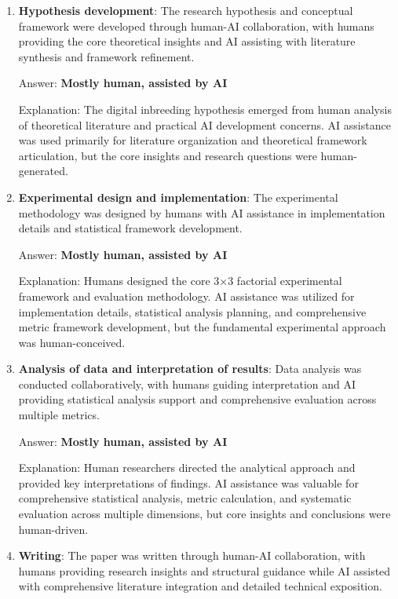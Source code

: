 \documentclass{article}
\begin{document}
\begin{enumerate}
    \item \textbf{Hypothesis development}: The research hypothesis and conceptual framework were developed through human-AI collaboration, with humans providing the core theoretical insights and AI assisting with literature synthesis and framework refinement.

    Answer: \textbf{Mostly human, assisted by AI}
    
    Explanation: The digital inbreeding hypothesis emerged from human analysis of theoretical literature and practical AI development concerns. AI assistance was used primarily for literature organization and theoretical framework articulation, but the core insights and research questions were human-generated.
    
    \item \textbf{Experimental design and implementation}: The experimental methodology was designed by humans with AI assistance in implementation details and statistical framework development.

    Answer: \textbf{Mostly human, assisted by AI}
    
    Explanation: Humans designed the core 3×3 factorial experimental framework and evaluation methodology. AI assistance was utilized for implementation details, statistical analysis planning, and comprehensive metric framework development, but the fundamental experimental approach was human-conceived.
    
    \item \textbf{Analysis of data and interpretation of results}: Data analysis was conducted collaboratively, with humans guiding interpretation and AI providing statistical analysis support and comprehensive evaluation across multiple metrics.
 

    Answer: \textbf{Mostly human, assisted by AI}
    
    Explanation: Human researchers directed the analytical approach and provided key interpretations of findings. AI assistance was valuable for comprehensive statistical analysis, metric calculation, and systematic evaluation across multiple dimensions, but core insights and conclusions were human-driven.
    
    \item \textbf{Writing}: The paper was written through human-AI collaboration, with humans providing research insights and structural guidance while AI assisted with comprehensive literature integration and detailed technical exposition.


\end{enumerate}
\end{document}
